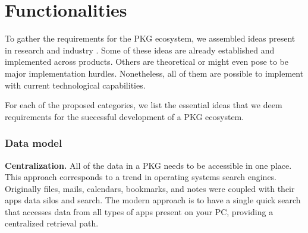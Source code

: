 

\section{Functionalities}

To gather the requirements for the PKG ecosystem, we assembled ideas present in research and industry \cite{Bush1945Memex, Davies2005Memex60, Matuschak2019TTFT,jones2007PIM}. Some of these ideas are already established and implemented across products. Others are theoretical or might even pose to be major implementation hurdles. Nonetheless, all of them are possible to implement with current technological capabilities.

For each of the proposed categories, we list the essential ideas that we deem requirements for the successful development of a PKG ecosystem.

\subsubsection*{Data model}

\textbf{Centralization.} All of the data in a PKG needs to be accessible in one place. This approach corresponds to a trend in operating systems search engines. Originally files, mails, calendars, bookmarks, and notes were coupled with their apps data silos and search. The modern approach is to have a single quick search that accesses data from all types of apps present on your PC, providing a centralized retrieval path.

